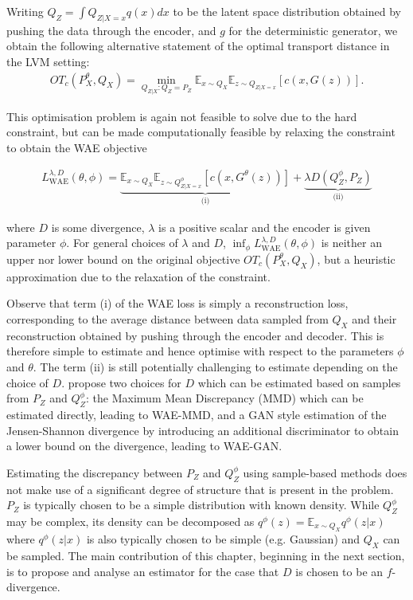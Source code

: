Writing $Q_Z = \int Q_{Z|X=x} q(x) dx$ to be the latent space distribution obtained by pushing the data through the encoder, and $g$ for the deterministic generator, we obtain the following alternative statement of the optimal transport distance in the LVM setting:
%
\begin{align*}
OT_c(P_X^\theta, Q_X) = \min_{Q_{Z|X}: Q_Z = P_Z} \mathbb{E}_{x\sim Q_X} \mathbb{E}_{z\sim Q_{Z|X=x}} \left[ c(x, G(z)) \right].
\end{align*}

This optimisation problem is again not feasible to solve due to the hard constraint, 
but can be made computationally feasible by relaxing the constraint to obtain the WAE objective

\begin{align}
L_{\text{WAE}}^{\lambda, D}(\theta, \phi) = \underbrace{\mathbb{E}_{x\sim Q_X} \mathbb{E}_{z\sim Q^\phi_{Z|X=x}} \left[ c(x, G^\theta(z)) \right]}_{\text{(i)}} + \underbrace{\lambda D\left(Q^\phi_Z, P_Z  \right)}_{\text{(ii)}}
\end{align}

where $D$ is some divergence, $\lambda$ is a positive scalar and the encoder is given parameter $\phi$.
For general choices of $\lambda$ and $D$, $\inf_{\phi} L_{\text{WAE}}^{\lambda, D}(\theta, \phi)$ is neither an upper nor lower bound on the original objective $OT_c(P_X^\theta, Q_X)$, but a heuristic approximation due to the relaxation of the constraint. 


Observe that term (i) of the WAE loss is simply a reconstruction loss, corresponding to the average distance between data sampled from $Q_X$ and their reconstruction obtained by pushing through the encoder and decoder.
This is therefore simple to estimate and hence optimise with respect to the parameters $\phi$ and $\theta$.
The term (ii) is still potentially challenging to estimate depending on the choice of $D$. 
\cite{tolstikhin} propose two choices for $D$ which can be estimated based on samples from $P_Z$ and $Q_Z^\phi$: the Maximum Mean Discrepancy (MMD) \cite{gretton} which can be estimated directly, leading to WAE-MMD, and a GAN style estimation of the Jensen-Shannon divergence by introducing an additional discriminator to obtain a lower bound on the divergence, leading to WAE-GAN. 

Estimating the discrepancy between $P_Z$ and $Q_Z^\phi$ using sample-based methods does not make use of a significant degree of structure that is present in the problem. $P_Z$ is typically chosen to be a simple distribution with known density. While $Q_Z^\phi$ may be complex, its density can be decomposed as $q^\phi(z) = \mathbb{E}_{x\sim Q_X} q^\phi(z|x)$ where $q^\phi(z|x)$ is also typically chosen to be simple (e.g. Gaussian) and $Q_X$ can be sampled.
The main contribution of this chapter, beginning in the next section, is to propose and analyse an estimator for the case that $D$ is chosen to be an $f$-divergence. 


